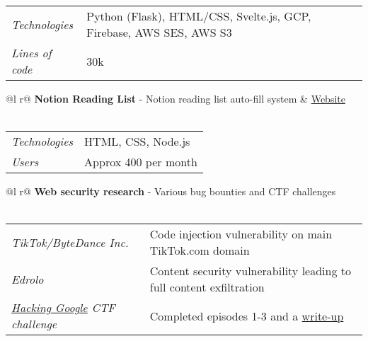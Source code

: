 \documentclass[a4paper,11pt]{article}
\begin{document}
\begin{tabularx}{\linewidth}{l X}
    \textit{Technologies} & \hfill Python (Flask), HTML/CSS, Svelte.js, GCP, Firebase, AWS SES, AWS S3 \\
    \textit{Lines of code} & \hfill 30k \\
\end{tabularx}

\begin{tabularx}{\linewidth}{ @{}l r@{} }
\textbf{Notion Reading List} - Notion reading list auto-fill system & \hfill \href{https://srg.id.au/notion-reading-list}{Website} \\[3.75pt]
  \\
\end{tabularx}

\begin{tabularx}{\linewidth}{l X}
    \textit{Technologies} & \hfill HTML, CSS, Node.js \\
    \textit{Users} & \hfill Approx 400 per month \\
\end{tabularx}

\begin{tabularx}{\linewidth}{ @{}l r@{} }
\textbf{Web security research} - Various bug bounties and CTF challenges \\[3.75pt]
  \\
\end{tabularx}

\begin{tabularx}{\linewidth}{l X}
    \textit{TikTok/ByteDance Inc.} & \hfill Code injection vulnerability on main TikTok.com domain \\
    \textit{Edrolo} & \hfill Content security vulnerability leading to full content exfiltration \\
    \textit{\href{https://h4ck1ng.google/}{Hacking Google} CTF challenge} & \hfill Completed episodes 1-3 and a \href{https://srg.id.au/posts/hacking-google/}{write-up} \\
\end{tabularx}

\end{document}
